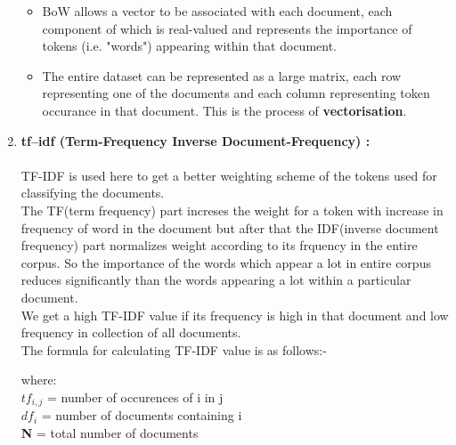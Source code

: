 \documentclass{report}
\begin{document}
\begin{enumerate}[label=\Roman*.]
\begin{itemize}
 \item BoW allows a vector to be associated with each document, each component of which is real-valued and represents the importance of tokens (i.e. "words") appearing within that document.
 \item The entire dataset can be represented as a large matrix, each row representing one of the documents and each column representing token occurance in that document. This is the process of \textbf{vectorisation}.
 \end{itemize}
 \item \textbf{tf–idf (Term-Frequency Inverse Document-Frequency) :}\\ \\
 TF-IDF is used here to get a better weighting scheme of the tokens used for classifying the documents.\\ \linebreak The TF(term frequency) part increses the weight for a token with increase in frequency of word in the document but after that the IDF(inverse document frequency) part normalizes weight according to its frquency in the entire corpus. So the importance of the words which appear a lot in entire corpus reduces significantly than the words appearing a lot within a particular document.\\ \linebreak
We get a high TF-IDF value if its frequency is high in that document and low frequency in collection of all documents.\\ \linebreak
The formula for calculating TF-IDF value is as follows:-
\begin{center} {
\Huge \textbf {}
}
\end{center}
\Large
where:\\
\linebreak
\textbf{\Huge \(tf_{i,j} \) }= number of occurences of i in j\\ 
\linebreak
\textbf{\Huge \(df_i \)} = number of documents containing i\\
\linebreak
\textbf{\Huge N} = total number of documents\\


\end{enumerate}
\end{document}
